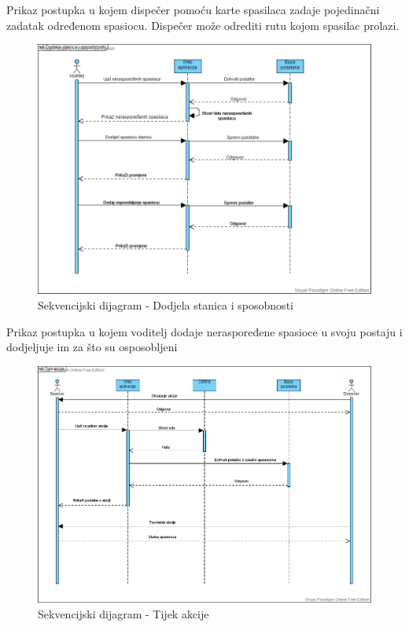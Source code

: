 				Prikaz postupka u kojem dispečer pomoću karte spasilaca zadaje pojedinačni zadatak određenom spasiocu.
				Dispečer može odrediti rutu kojom spasilac prolazi.
				
				\begin{figure}[H]
					\includegraphics[scale=0.5]{slike/Voditelj.PNG}
					\centering
					\caption{Sekvencijski dijagram - Dodjela stanica i sposobnosti}
					\label{fig:voditelj}
				\end{figure}
			
				Prikaz postupka u kojem voditelj dodaje neraspoređene spasioce u svoju postaju i dodjeljuje im za što su osposobljeni
				
				\begin{figure}[H]
					\includegraphics[scale=0.4]{slike/Akcija.PNG}
					\centering
					\caption{Sekvencijski dijagram - Tijek akcije}
					\label{fig:tijekakcije}
				\end{figure}
			

